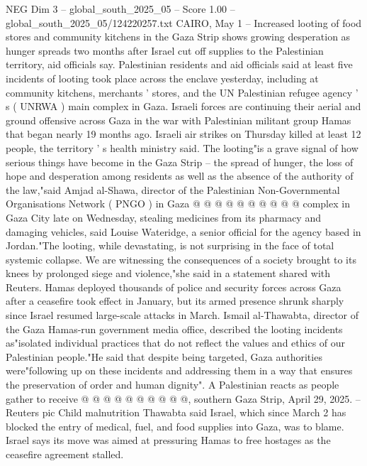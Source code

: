 \begin{textsample}{NEG Dim 3 – global\_south\_2025\_05 – Score 1.00 – global\_south\_2025\_05/124220257.txt}  \label{ex:f3_neg_222}
CAIRO, May 1 -- Increased looting of food stores and community kitchens in the Gaza Strip shows growing desperation as hunger spreads two months after Israel cut off supplies to the Palestinian territory, aid officials say.
Palestinian residents and aid officials said at least five incidents of looting took place across the enclave yesterday, including at community kitchens, merchants ' stores, and the UN Palestinian refugee agency ' s ( UNRWA ) main complex in Gaza.
Israeli forces are continuing their aerial and ground offensive across Gaza in the war with Palestinian militant group Hamas that began nearly 19 months ago.
Israeli air strikes on Thursday killed at least 12 people, the territory ' s health ministry said.
The looting"is a grave signal of how serious things have become in the Gaza Strip -- the spread of hunger, the loss of hope and desperation among residents as well as the absence of the authority of the law,"said Amjad al-Shawa, director of the Palestinian Non-Governmental Organisations Network ( PNGO ) in Gaza @ @ @ @ @ @ @ @ @ @ complex in Gaza City late on Wednesday, stealing medicines from its pharmacy and damaging vehicles, said Louise Wateridge, a senior official for the agency based in Jordan."The looting, while devastating, is not surprising in the face of total systemic collapse.
We are witnessing the consequences of a society brought to its knees by prolonged siege and violence,"she said in a statement shared with Reuters.
Hamas deployed thousands of police and security forces across Gaza after a ceasefire took effect in January, but its armed presence shrunk sharply since Israel resumed large-scale attacks in March.
Ismail al-Thawabta, director of the Gaza Hamas-run government media office, described the looting incidents as"isolated individual practices that do not reflect the values and ethics of our Palestinian people."He said that despite being targeted, Gaza authorities were"following up on these incidents and addressing them in a way that ensures the preservation of order and human dignity".
A Palestinian reacts as people gather to receive @ @ @ @ @ @ @ @ @ @, southern Gaza Strip, April 29, 2025. -- Reuters pic Child malnutrition Thawabta said Israel, which since March 2 has blocked the entry of medical, fuel, and food supplies into Gaza, was to blame.
Israel says its move was aimed at pressuring Hamas to free hostages as the ceasefire agreement stalled.

\end{textsample}

